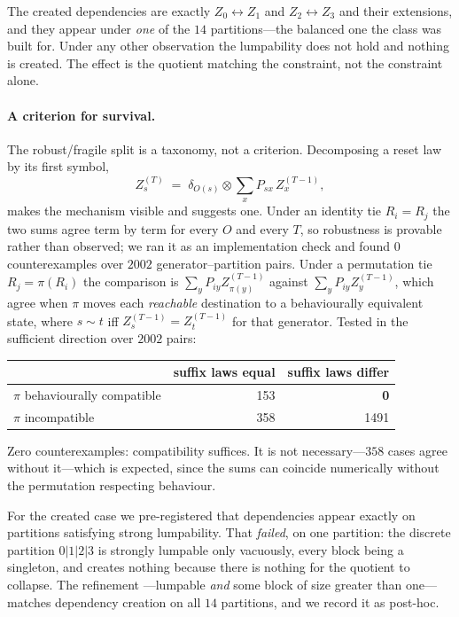 \documentclass[11pt]{article}
\begin{document}
The created dependencies are exactly $Z_0 \leftrightarrow Z_1$ and
$Z_2 \leftrightarrow Z_3$ and their extensions, and they appear under \emph{one} of the
$14$ partitions---the balanced one the class was built for. Under any other observation the
lumpability does not hold and nothing is created. The effect is the quotient matching the
constraint, not the constraint alone.

\paragraph{A criterion for survival.}
The robust/fragile split is a taxonomy, not a criterion. Decomposing a reset law by its
first symbol,
\[
  Z_s^{(T)} \;=\; \delta_{O(s)} \otimes \sum_x P_{sx}\, Z_x^{(T-1)},
\]
makes the mechanism visible and suggests one. Under an identity tie $R_i = R_j$ the two
sums agree term by term for every $O$ and every $T$, so robustness is provable rather than
observed; we ran it as an implementation check and found $0$ counterexamples over $2002$
generator--partition pairs. Under a permutation tie $R_j = \pi(R_i)$ the comparison is
$\sum_y P_{iy} Z_{\pi(y)}^{(T-1)}$ against $\sum_y P_{iy} Z_y^{(T-1)}$, which agree when
$\pi$ moves each \emph{reachable} destination to a behaviourally equivalent state, where
$s \sim t$ iff $Z_s^{(T-1)} = Z_t^{(T-1)}$ for that generator. Tested in the sufficient
direction over $2002$ pairs:

\begin{center}
\begin{tabular}{lrr}
\toprule
 & suffix laws equal & suffix laws differ \\
\midrule
$\pi$ behaviourally compatible   & 153 & \textbf{0} \\
$\pi$ incompatible               & 358 & 1491 \\
\bottomrule
\end{tabular}
\end{center}

Zero counterexamples: compatibility suffices. It is not necessary---$358$ cases agree
without it---which is expected, since the sums can coincide numerically without the
permutation respecting behaviour.

For the created case we pre-registered that dependencies appear exactly on partitions
satisfying strong lumpability. That \emph{failed}, on one partition: the discrete
partition $0|1|2|3$ is strongly lumpable only vacuously, every block being a singleton, and
creates nothing because there is nothing for the quotient to collapse. The refinement
---lumpable \emph{and} some block of size greater than one---matches dependency creation
on all $14$ partitions, and we record it as post-hoc.
\end{document}
